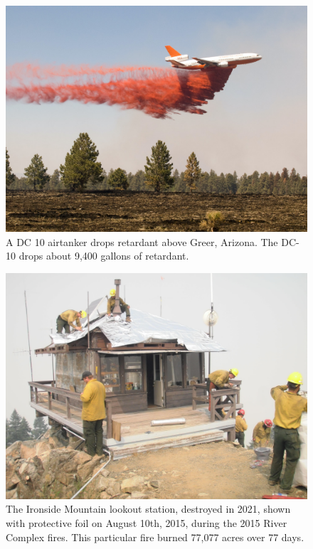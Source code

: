 \documentclass[]             %
{NASA}                       %
\theoremstyle{definition}
\begin{document}
\begin{figure}[h]
\centering
\includegraphics[scale=0.4]{images/dc10.jpg}
\caption{A DC 10 airtanker drops retardant above Greer, Arizona. The DC-10 drops about 9,400 gallons of retardant.}
\end{figure}

\begin{figure}[h]
\centering
\includegraphics[scale=0.085]{images/ironside.jpg}
\caption{The Ironside Mountain lookout station, destroyed in 2021, shown with protective foil on August 10th, 2015, during the 2015 River Complex fires. This particular fire burned 77,077 acres over 77 days.}
\end{figure}
\end{document}
